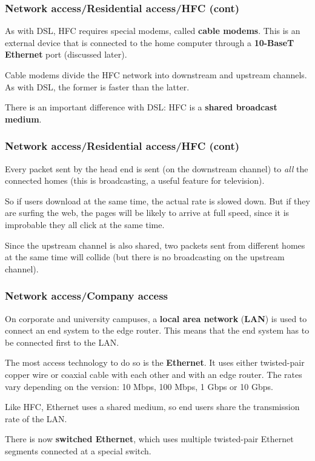 %
\begin{frame}
\frametitle{Network access/Residential access/HFC (cont)}

As with DSL, HFC requires special modems, called \textbf{cable
modems}. This is an external device that is connected to the home
computer through a \textbf{10-BaseT Ethernet} port (discussed later). 

\bigskip

Cable modems divide the HFC network into downstream and upstream
channels. As with DSL, the former is faster than the latter.

\bigskip

There is an important difference with DSL: HFC is a \textbf{shared
broadcast medium}.

\end{frame}

%
\begin{frame}
\frametitle{Network access/Residential access/HFC (cont)}

Every packet sent by the head end is sent (on the downstream channel)
to \emph{all} the connected homes (this is broadcasting, a useful
feature for television). 

\bigskip

So if users download at the same time, the actual rate is slowed
down. But if they are surfing the web, the pages will be likely to
arrive at full speed, since it is improbable they all click at the
same time.

\bigskip

Since the upstream channel is also shared, two packets sent from
different homes at the same time will collide (but there is no
broadcasting on the upstream channel).

\end{frame}

%
\begin{frame}
\frametitle{Network access/Company access}

On corporate and university campuses, a \textbf{local area network}
(\textbf{LAN}) is used to connect an end system to the edge
router. This means that the end system has to be connected first to
the LAN.

\bigskip

The most access technology to do so is the \textbf{Ethernet}. It uses
either twisted-pair copper wire or coaxial cable with each other and
with an edge router. The rates vary depending on the version: 10 Mbps,
100 Mbps, 1 Gbps or 10 Gbps.

\bigskip

Like HFC, Ethernet uses a shared medium, so end users share the
transmission rate of the LAN.

\bigskip

There is now \textbf{switched Ethernet}, which uses multiple
twisted-pair Ethernet segments connected at a special switch.

\end{frame}


